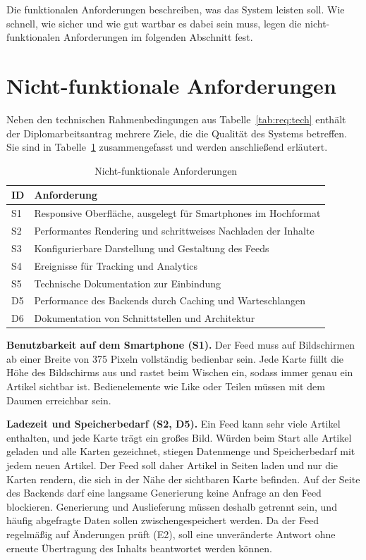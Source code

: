 Die funktionalen Anforderungen beschreiben, was das System leisten soll.
Wie schnell, wie sicher und wie gut wartbar es dabei sein muss, legen die nicht-funktionalen Anforderungen im folgenden Abschnitt fest.

\section{Nicht-funktionale Anforderungen}
\setauthor{\secondauthor}

Neben den technischen Rahmenbedingungen aus Tabelle~\ref{tab:req:tech} enthält der Diplomarbeitsantrag mehrere Ziele, die die Qualität des Systems betreffen.
Sie sind in Tabelle~\ref{tab:req:nonfunctional} zusammengefasst und werden anschließend erläutert.

\begin{table}
    \centering
    \small
    \begin{tabularx}{\textwidth}{l >{\raggedright\arraybackslash}X}
        \toprule
        \textbf{ID} & \textbf{Anforderung} \\
        \midrule
        S1 & Responsive Oberfläche, ausgelegt für Smartphones im Hochformat \\
        S2 & Performantes Rendering und schrittweises Nachladen der Inhalte \\
        S3 & Konfigurierbare Darstellung und Gestaltung des Feeds \\
        S4 & Ereignisse für Tracking und Analytics \\
        S5 & Technische Dokumentation zur Einbindung \\
        D5 & Performance des Backends durch Caching und Warteschlangen \\
        D6 & Dokumentation von Schnittstellen und Architektur \\
        \bottomrule
    \end{tabularx}
    \caption{Nicht-funktionale Anforderungen}
    \label{tab:req:nonfunctional}
\end{table}

\textbf{Benutzbarkeit auf dem Smartphone (S1).}
Der Feed muss auf Bildschirmen ab einer Breite von 375 Pixeln vollständig bedienbar sein.
Jede Karte füllt die Höhe des Bildschirms aus und rastet beim Wischen ein, sodass immer genau ein Artikel sichtbar ist.
Bedienelemente wie Like oder Teilen müssen mit dem Daumen erreichbar sein.

\textbf{Ladezeit und Speicherbedarf (S2, D5).}
Ein Feed kann sehr viele Artikel enthalten, und jede Karte trägt ein großes Bild.
Würden beim Start alle Artikel geladen und alle Karten gezeichnet, stiegen Datenmenge und Speicherbedarf mit jedem neuen Artikel.
Der Feed soll daher Artikel in Seiten laden und nur die Karten rendern, die sich in der Nähe der sichtbaren Karte befinden.
Auf der Seite des Backends darf eine langsame Generierung keine Anfrage an den Feed blockieren.
Generierung und Auslieferung müssen deshalb getrennt sein, und häufig abgefragte Daten sollen zwischengespeichert werden.
Da der Feed regelmäßig auf Änderungen prüft (E2), soll eine unveränderte Antwort ohne erneute Übertragung des Inhalts beantwortet werden können.


